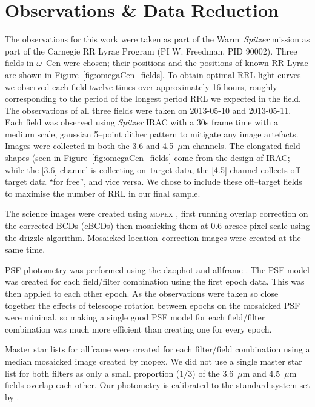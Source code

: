 \documentclass[a4paper,fleqn,usenatbib]{mnras}
\begin{document}
\section{Observations \& Data Reduction}
\label{sec:observations}
The observations for this work were taken as part of the Warm~\textit{Spitzer} mission as part of the Carnegie RR Lyrae Program (PI W. Freedman, PID 90002). Three fields in $\omega$~Cen were chosen; their positions and the positions of known RR Lyrae are shown in Figure~\ref{fig:omegaCen_fields}. To obtain optimal RRL light curves we observed each field twelve times over approximately 16 hours, roughly corresponding to the period of the longest period RRL we expected in the field. The observations of all three fields were taken on 2013-05-10 and 2013-05-11. Each field was observed using {\it Spitzer} IRAC \citep{2004ApJS..154...10F} with a 30s frame time with a medium scale, gaussian 5--point dither pattern to mitigate any image artefacts. Images were collected in both the 3.6 and 4.5~$\mu$m channels. 
The elongated field shapes (seen in Figure~\ref{fig:omegaCen_fields} come from the design of IRAC; while the [3.6] channel is collecting on--target data, the [4.5] channel collects off target data ``for free'', and vice versa. We chose to include these off--target fields to maximise the number of RRL in our final sample. 

The science images were created using \textsc{mopex} \citep{2006SPIE.6274E..0CM}, first running overlap correction on the corrected BCDs (cBCDs) then mosaicking them at 0.6 arcsec pixel scale using the drizzle algorithm. Mosaicked location--correction images were created at the same time. 

PSF photometry was performed using the {\sc daophot} and {\sc allframe} \citep{1987PASP...99..191S, 1994PASP..106..250S}. The PSF model was created for each field/filter combination using the first epoch data. This was then applied to each other epoch. As the observations were taken so close together the effects of telescope rotation between epochs on the mosaicked PSF were minimal, so making a single good PSF model for each field/filter combination was much more efficient than creating one for every epoch. 

Master star lists for {\sc allframe} were created for each filter/field combination using a median mosaicked image created by {\sc mopex}. We did not use a single master star list for both filters as only a small proportion ($1/3$) of the 3.6~$\mu$m and 4.5~$\mu$m fields overlap each other. Our photometry is calibrated to the standard system set by \citet{2005PASP..117..978R}.
\end{document}
